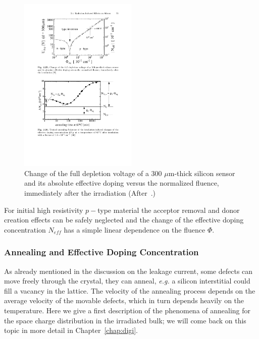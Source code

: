  \begin{figure}[htpb]
 \centering
 \includegraphics[width=0.5\textwidth]{typeinversion.pdf}
 \caption{\label{fig:typeinversion} Change of the full depletion voltage of a 300 $\mu$m-thick silicon 
 sensor and its absolute effective doping versus the normalized fluence, immediately after the irradiation (After~\cite{wunstors-thesis}.)}
 \end{figure}

For initial high resistivity $p-$type material the acceptor removal and donor creation effects can be 
safely neglected and the change of the effective doping concentration $N_{eff}$ has a simple linear 
dependence on the fluence $\Phi$.





\subsubsection{Annealing and Effective Doping Concentration}

 
As already mentioned in the discussion on the leakage current,  some defects can move freely 
through the crystal, they can anneal, {\it e.g.} a silicon interstitial 
could fill a vacancy in the lattice. The velocity of the annealing process depends on the average 
velocity of the movable defects, which in turn depends heavily on the temperature.
Here we give a first description of the phenomena of annealing for the space charge 
distribution in the irradiated bulk; we will come back on this topic in more detail in Chapter~\ref{chap:digi}.

